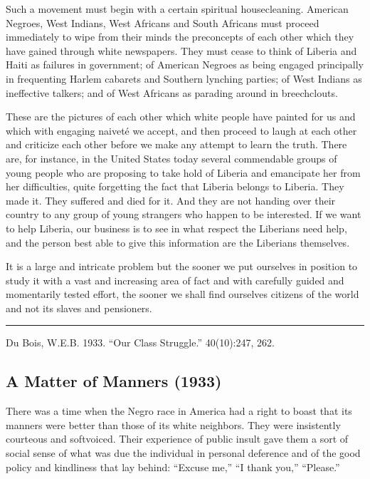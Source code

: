 \documentclass[letterpaper,10pt,english]{jupyterBook}
\begin{document}
\sphinxAtStartPar
Such a movement must begin with a certain spiritual housecleaning. American Negroes, West Indians, West Africans and South Africans must proceed immediately to wipe from their minds the preconcepts of each other which they have gained through white newspapers. They must cease to think of Liberia and Haiti as failures in government; of American Negroes as being engaged principally in frequenting Harlem cabarets and Southern lynching parties; of West Indians as ineffective talkers; and of West Africans as parading around in breech\sphinxhyphen{}clouts.

\sphinxAtStartPar
These are the pictures of each other which white people have painted for us and which with engaging naiveté we accept, and then proceed to laugh at each other and criticize each other before we make any attempt to learn the truth. There are, for instance, in the United States today several commendable groups of young people who are proposing to take hold of Liberia and emancipate her from her difficulties, quite forgetting the fact that Liberia belongs to Liberia. They made it. They suffered and died for it. And they are not handing over their country to any group of young strangers who happen to be interested. If we want to help Liberia, our business is to see in what respect the Liberians need help, and the person best able to give this information are the Liberians themselves.

\sphinxAtStartPar
It is a large and intricate problem but the sooner we put ourselves in position to study it with a vast and increasing area of fact and with carefully guided and momentarily tested effort, the sooner we shall find ourselves citizens of the world and not its slaves and pensioners.


\bigskip\hrule\bigskip


\sphinxAtStartPar
{} Du Bois, W.E.B. 1933. “Our Class Struggle.”  40(10):247, 262.


\subsection{A Matter of Manners (1933)}
\label{\detokenize{Volumes/40/12/matter_of_manners:a-matter-of-manners-1933}}\label{\detokenize{Volumes/40/12/matter_of_manners::doc}}
\sphinxAtStartPar
There was a time when the Negro race in America had a right to boast that its manners were better than those of its white neighbors. They were insistently courteous and soft\sphinxhyphen{}voiced. Their experience of public insult gave them a sort of social sense of what was due the individual in personal deference and of the good policy and kindliness that lay behind: “Excuse me,” “I thank you,” “Please.”
\end{document}
